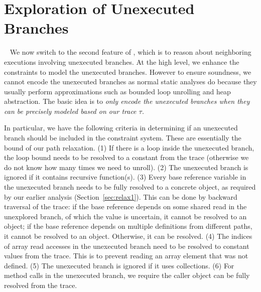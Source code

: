 \section{Exploration of Unexecuted Branches}~\label{sec:relax2}
We now switch to the second feature of \tool, which is to reason about 
neighboring executions involving unexecuted branches.
At the high level, we enhance the constraints to model the unexecuted branches.
However to ensure soundness, we cannot encode the unexecuted branches as
normal static analyses do because they usually perform approximations such as bounded
loop unrolling and heap abstraction. The basic idea is to {\em only encode the
unexecuted branches when they can be precisely modeled based on our trace 
$\tau$.} 

In particular, we have the following criteria in determining if an 
unexecuted branch should be included in the constraint system. These are 
essentially the bound of our path relaxation.
(1) If there is a loop inside the unexecuted branch, the loop bound needs to
be resolved to a constant from the trace (otherwise we do not know how many
times we need to unroll). (2) The unexecuted branch
is ignored if it contains recursive function(s). (3) Every base reference 
variable in the unexecuted branch needs to be fully resolved to a concrete object,
as required by our earlier analysis (Section~\ref{sec:relax1}). This can be 
done by backward traversal of the trace:
if the base reference depends on some shared read in the unexplored 
branch, of which the value is uncertain, it cannot be 
resolved to an object; if the base reference depends on multiple definitions 
from different paths, it cannot be resolved to an object.
Otherwise, it can be resolved.
(4) The indices of array read accesses in the unexecuted branch 
need to be resolved to constant values from the trace. This is to
prevent reading an array element that was not defined. 
(5) The unexecuted branch is ignored if it uses collections. 
(6) For method calls in the unexecuted branch, we require the  caller object can be fully resolved from
the trace.
 
